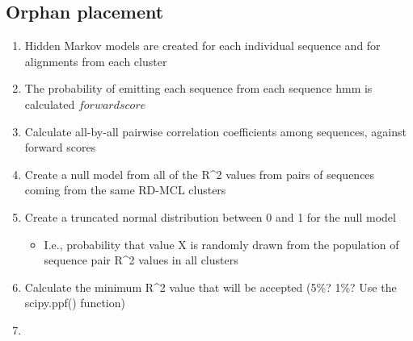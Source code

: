 \documentclass[twocolumn]{bmcart}  %
\begin{document}
\subsection{Orphan placement}\label{subsec:orphanPlacement}
\begin{enumerate}
  \item Hidden Markov models are created for each individual sequence and for alignments from each cluster
  \item The probability of emitting each sequence from each sequence hmm is calculated \(forward score\)
  \item Calculate all-by-all pairwise correlation coefficients among sequences, against forward scores
  \item Create a null model from all of the R\textasciicircum2 values from pairs of sequences coming from the same RD-MCL clusters
  \item Create a truncated normal distribution between 0 and 1 for the null model
    \begin{itemize}
    \item I.e., probability that value X is randomly drawn from the population of sequence pair R\textasciicircum2 values in all clusters
    \end{itemize}
  \item Calculate the minimum R\textasciicircum2 value that will be accepted (5\%? 1\%? Use the scipy.ppf() function)
  \item
\end{enumerate}



\end{document}
